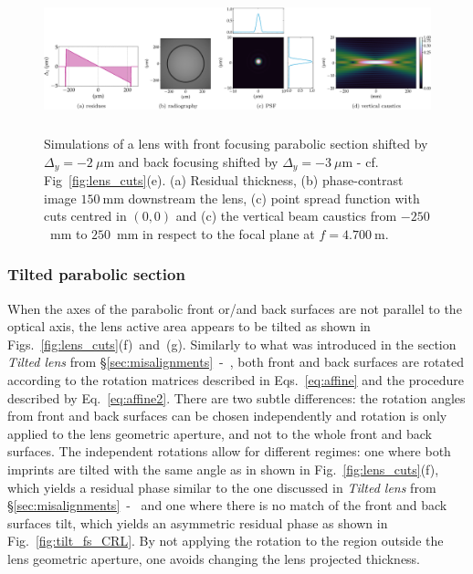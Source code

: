 \begin{refsection}
\begin{figure}[t]
        \centering
        \includegraphics[height=4.19cm]{figures/ch04/offset_fs_CRL.pdf}
        \caption[Effects of the transverse offset of the parabolic section]{Simulations of a lens with front focusing parabolic section shifted by $\Delta_y=-2~\mu$m and back focusing shifted by $\Delta_y=-3~\mu$m - cf. Fig~\ref{fig:lens_cuts}(e). (a) Residual thickness, (b) phase-contrast image $150~$mm downstream the lens, (c) point spread function with cuts centred in $(0,0)$ and (c) the vertical beam caustics from $-250$~mm to $250$~mm in respect to the focal plane at $f=4.700~$m.} \label{fig:offset_fs_CRL}
\end{figure}

\subsubsection*{Tilted parabolic section}

When the axes of the parabolic front or/and back surfaces are not parallel to the optical axis, the lens active area appears to be tilted as shown in Figs.~\ref{fig:lens_cuts}(f)~and~(g). Similarly to what was introduced in the section \textit{Tilted lens} from \S\ref{sec:misalignments}~-~\textit{}, both front and back surfaces are rotated according to the rotation matrices described in Eqs.~\ref{eq:affine} and the procedure described by Eq.~\ref{eq:affine2}. There are two subtle differences: the rotation angles from front and back surfaces can be chosen independently and rotation is only applied to the lens geometric aperture, and not to the whole front and back surfaces. The independent rotations allow for different regimes: one where both imprints are tilted with the same angle as in shown in Fig.~\ref{fig:lens_cuts}(f), which yields a residual phase similar to the one discussed in \textit{Tilted lens} from \S\ref{sec:misalignments}~-~\textit{} and  one where there is no match of the front and back surfaces tilt, which yields an asymmetric residual phase as shown in Fig.~\ref{fig:tilt_fs_CRL}. By not applying the rotation to the region outside the lens geometric aperture, one avoids changing the lens projected thickness.


\end{refsection}
